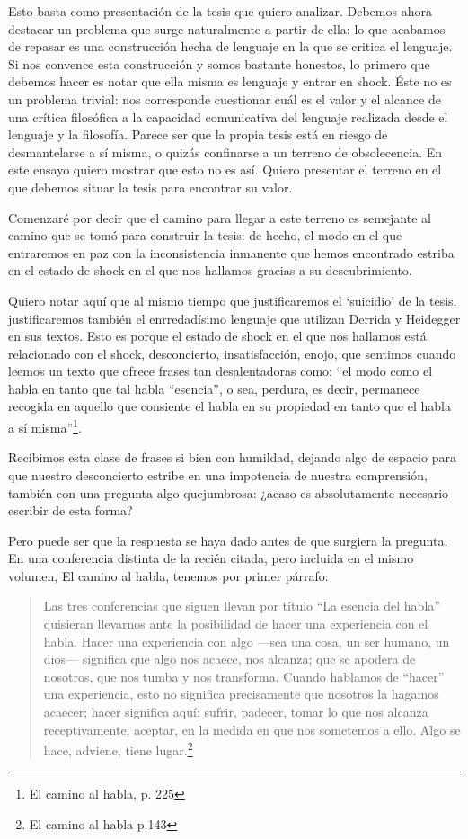 Esto basta como presentación de la tesis que
quiero analizar. Debemos ahora destacar un
problema que surge naturalmente a partir de
ella: lo que acabamos de repasar es una
construcción hecha de lenguaje en la que se
critica el lenguaje. Si nos convence esta
construcción y somos bastante honestos, lo
primero que debemos hacer es notar que ella
misma es lenguaje y entrar en shock. Éste no
es un problema trivial: nos corresponde
cuestionar cuál es el valor y el alcance de
una crítica filosófica a la capacidad
comunicativa del lenguaje realizada desde el
lenguaje y la filosofía. Parece ser que la
propia tesis está en riesgo de desmantelarse
a sí misma, o quizás confinarse a un terreno
de obsolecencia. En este ensayo quiero
mostrar que esto no es así. Quiero presentar
el terreno en el que debemos situar la tesis
para encontrar su valor.

Comenzaré por decir que el camino para llegar
a este terreno es semejante al camino que se
tomó para construir la tesis: de hecho, el
modo en el que entraremos en paz con la
inconsistencia inmanente que hemos encontrado
estriba en el estado de shock en el que nos
hallamos gracias a su descubrimiento.

Quiero notar aquí que al mismo tiempo que
justificaremos el `suicidio' de la tesis,
justificaremos también el enrredadísimo
lenguaje que utilizan Derrida y Heidegger en
sus textos. Esto es porque el estado de shock
en el que nos hallamos está relacionado con
el shock, desconcierto, insatisfacción,
enojo, que sentimos cuando leemos un texto
que ofrece frases tan desalentadoras como:
``el modo como el habla en tanto que tal
habla ``esencia'', o sea, perdura, es decir,
permanece recogida en aquello que consiente
el habla en su propiedad en tanto que el
habla a sí misma''\footnote{El camino al
habla, p. 225}.

Recibimos esta clase de frases si bien con
humildad, dejando algo de espacio para que
nuestro desconcierto estribe en una
impotencia de nuestra comprensión, también
con una pregunta algo quejumbrosa: ¿acaso es
absolutamente necesario escribir de esta
forma?

Pero puede ser que la respuesta se haya dado
antes de que surgiera la pregunta. En una
conferencia distinta de la recién citada,
pero incluida en el mismo volumen, El camino
al habla, tenemos por primer párrafo:

\begin{quote}
Las tres conferencias que siguen llevan por
título ``La esencia del habla'' quisieran
llevarnos ante la posibilidad de hacer una
experiencia con el habla. Hacer una
experiencia con algo ---sea una cosa, un ser
humano, un dios--- significa que algo nos
acaece, nos alcanza; que se apodera de
nosotros, que nos tumba y nos transforma.
Cuando hablamos de ``hacer'' una experiencia,
esto no significa precisamente que nosotros
la hagamos acaecer; hacer significa aquí:
sufrir, padecer, tomar lo que nos alcanza
receptivamente, aceptar, en la medida en que
nos sometemos a ello. Algo se hace, adviene,
tiene lugar.\footnote{El camino al habla
p.143}
\end{quote}

